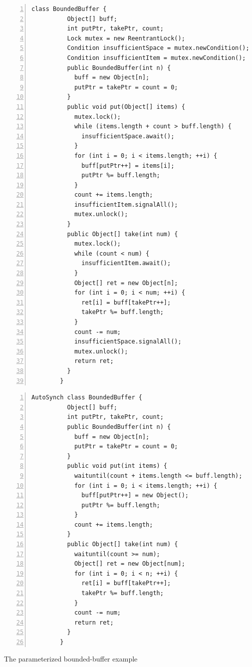 \documentclass[preprint]{sigplanconf}
\begin{document}
\begin{figure}[ht!]
\begin{multicols}{2}
    \begin{Verbatim}[fontsize=\footnotesize,gobble=8,frame=topline,
            framesep=5mm,numbers=left,numbersep=2pt,
            label=\fbox{\small\emph{Explicit-Signal}}]
        class BoundedBuffer {
          Object[] buff;  
          int putPtr, takePtr, count;
          Lock mutex = new ReentrantLock();
          Condition insufficientSpace = mutex.newCondition();
          Condition insufficientItem = mutex.newCondition();
          public BoundedBuffer(int n) {
            buff = new Object[n];
            putPtr = takePtr = count = 0;
          }
          public void put(Object[] items) {
            mutex.lock();
            while (items.length + count > buff.length) {
              insufficientSpace.await();
            }
            for (int i = 0; i < items.length; ++i) {
              buff[putPtr++] = items[i];
              putPtr %= buff.length;
            }
            count += items.length;
            insufficientItem.signalAll();
            mutex.unlock();
          }
          public Object[] take(int num) {
            mutex.lock();
            while (count < num) {
              insufficientItem.await();
            }
            Object[] ret = new Object[n];
            for (int i = 0; i < num; ++i) {
              ret[i] = buff[takePtr++];
              takePtr %= buff.length;
            }
            count -= num;
            insufficientSpace.signalAll();
            mutex.unlock();
            return ret;
          }
        }
    \end{Verbatim}
    \begin{Verbatim}[fontsize=\footnotesize,gobble=8,frame=lines,framesep=5mm,
            numbers=left,numbersep=2pt,
            label=\fbox{\small\emph{Automatic-Signal}}]
        AutoSynch class BoundedBuffer { 
          Object[] buff; 
          int putPtr, takePtr, count; 
          public BoundedBuffer(int n) {
            buff = new Object[n];
            putPtr = takePtr = count = 0;
          }
          public void put(int items) { 
            waituntil(count + items.length <= buff.length); 
            for (int i = 0; i < items.length; ++i) {
              buff[putPtr++] = new Object(); 
              putPtr %= buff.length;
            }
            count += items.length; 
          } 
          public Object[] take(int num) { 
            waituntil(count >= num);
            Object[] ret = new Object[num];
            for (int i = 0; i < n; ++i) {
              ret[i] = buff[takePtr++]; 
              takePtr %= buff.length; 
            }
            count -= num;
            return ret;
          }
        }
    \end{Verbatim}
\end{multicols}
    \caption{The parameterized bounded-buffer example}
    \label{fig:bb_exp}
\end{figure}
\end{document}
